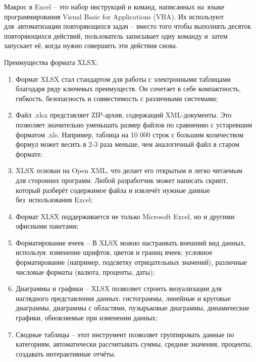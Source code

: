 \documentclass{ou}
\begin{document}
Макрос в Excel -- это набор инструкций и команд, написанных на~языке программирования Visual Basic for Applications (VBA). Их используют для~автоматизации повторяющихся задач -- вместо того чтобы выполнять десяток повторяющихся действий, пользователь записывает одну команду и~затем запускает её, когда нужно совершить эти действия снова.

Преимущества формата XLSX:
\begin{enumerate}[leftmargin=0em, itemindent=3.75em, nosep, label=\arabic*)]
\item Формат XLSX стал стандартом для работы с электронными таблицами благодаря ряду ключевых преимуществ. Он сочетает в себе компактность, гибкость, безопасность и совместимость с различными системами;
\item Файл .xlsx представляет ZIP-архив, содержащий XML-документы. Это позволяет значительно уменьшать размер файлов по сравнению с устаревшим форматом .xls. Например, таблица на 10 000 строк с большим количеством формул может весить в 2-3 раза меньше, чем аналогичный файл в старом формате;
\item XLSX основан на Open XML, что делает его открытым и легко читаемым для сторонних программ. Любой разработчик может написать скрипт, который разберёт содержимое файла и извлечёт нужные данные без~использования Excel;
\item Формат XLSX поддерживается не только Microsoft Excel, но и другими офисными пакетами;
\item Форматирование ячеек -- В XLSX можно настраивать внешний вид данных, используя: изменение шрифтов, цветов и границ ячеек; условное форматирование (например, подсветку отрицательных значений), различные числовые форматы (валюта, проценты, даты);
\item Диаграммы и графики -- XLSX позволяет строить визуализации для наглядного представления данных: гистограммы, линейные и круговые диаграммы, диаграммы с областями, пузырьковые диаграммы, динамические графики, обновляемые при изменении данных;
\item Сводные таблицы -- этот инструмент позволяет группировать данные по категориям, автоматически рассчитывать суммы, средние значения, проценты, создавать интерактивные отчёты.
\end{enumerate}
\end{document}
